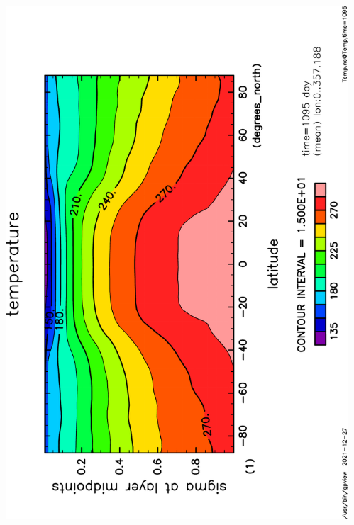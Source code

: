 \documentclass[aspectratio=149,9pt,fleqn]{beamer}
\begin{document}
\begin{frame}
\begin{columns}
\begin{column}{.4\textwidth}
		\end{column}
		\begin{column}{.4\textwidth}
			\includegraphics[height=\textwidth,angle=-90]{S1500Temp,time=1095-crop.pdf}
		\end{column}
	\end{columns}
\end{frame}
\end{document}
